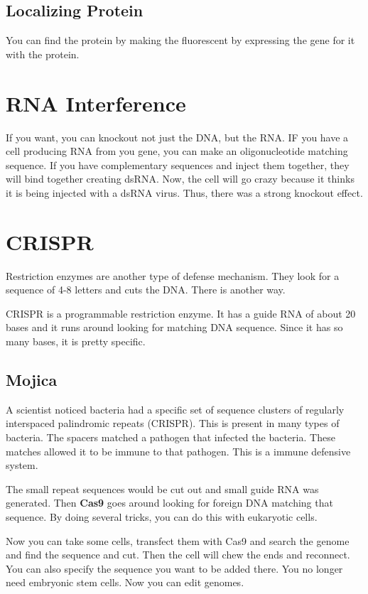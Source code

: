 \documentclass{article}
\begin{document}
\subsection{Localizing Protein}

You can find the protein by making the fluorescent by expressing the gene for it with the protein.

\section{RNA Interference}

If you want, you can knockout not just the DNA, but the RNA. IF you have a cell producing RNA from you gene, you can make an oligonucleotide matching sequence. If you have complementary sequences and inject them together, they will bind together creating dsRNA. Now, the cell will go crazy because it thinks it is being injected with a dsRNA virus. Thus, there was a strong knockout effect.

\section{CRISPR}

Restriction enzymes are another type of defense mechanism. They look for a sequence of 4-8 letters and cuts the DNA. There is another way.

CRISPR is a programmable restriction enzyme. It has a guide RNA of about 20 bases and it runs around looking for matching DNA sequence. Since it has so many bases, it is pretty specific.

\subsection{Mojica}

A scientist noticed bacteria had a specific set of sequence clusters of regularly interspaced palindromic repeats (CRISPR). This is present in many types of bacteria. The spacers matched a pathogen that infected the bacteria. These matches allowed it to be immune to that pathogen. This is a immune defensive system.

The small repeat sequences would be cut out and small guide RNA was generated. Then \textbf{Cas9} goes around looking for foreign DNA matching that sequence. By doing several tricks, you can do this with eukaryotic cells.

Now you can take some cells, transfect them with Cas9 and search the genome and find the sequence and cut. Then the cell will chew the ends and reconnect. You can also specify the sequence you want to be added there. You no longer need embryonic stem cells. Now you can edit genomes.
\end{document}

